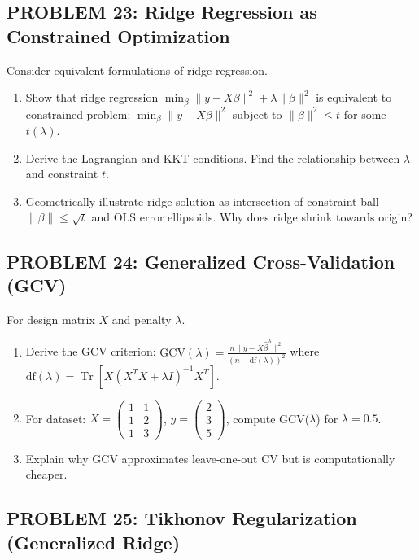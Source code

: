 \documentclass[12pt]{article}
\DeclareMathOperator{\Tr}{Tr}
\begin{document}
\subsection*{PROBLEM 23: Ridge Regression as Constrained Optimization}

Consider equivalent formulations of ridge regression.

\begin{enumerate}
\item[(a)] Show that ridge regression \(\min_\beta \|y - X\beta\|^2 + \lambda\|\beta\|^2\) is equivalent to constrained problem: \(\min_\beta \|y - X\beta\|^2\) subject to \(\|\beta\|^2 \leq t\) for some \(t(\lambda)\).
\item[(b)] Derive the Lagrangian and KKT conditions. Find the relationship between \(\lambda\) and constraint \(t\).
\item[(c)] Geometrically illustrate ridge solution as intersection of constraint ball \(\|\beta\| \leq \sqrt{t}\) and OLS error ellipsoids. Why does ridge shrink towards origin?
\end{enumerate}

\subsection*{PROBLEM 24: Generalized Cross-Validation (GCV)}

For design matrix \(X\) and penalty \(\lambda\).

\begin{enumerate}
\item[(a)] Derive the GCV criterion: \(\text{GCV}(\lambda) = \frac{n\|y - X\hat{\beta}^{\lambda}\|^2}{(n - \text{df}(\lambda))^2}\) where \(\text{df}(\lambda) = \Tr[X(X^TX + \lambda I)^{-1}X^T]\).
\item[(b)] For dataset: \(X = \begin{pmatrix} 1 & 1 \\ 1 & 2 \\ 1 & 3 \end{pmatrix}\), \(y = \begin{pmatrix} 2 \\ 3 \\ 5 \end{pmatrix}\), compute GCV(\(\lambda\)) for \(\lambda = 0.5\).
\item[(c)] Explain why GCV approximates leave-one-out CV but is computationally cheaper.
\end{enumerate}

\subsection*{PROBLEM 25: Tikhonov Regularization (Generalized Ridge)}
\end{document}
